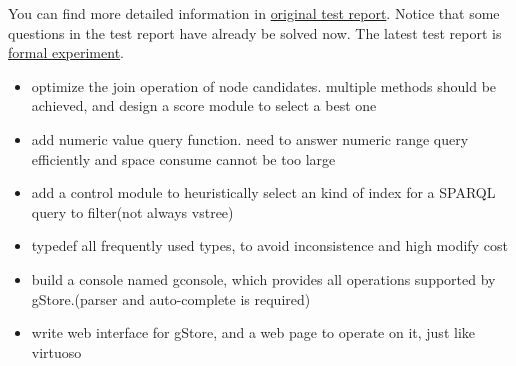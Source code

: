 \documentclass[titlepage, a4paper, 12pt]{article}
\begin{document}
You can find more detailed information in \href{run:../pdf/gstore_test_report.pdf}{original test report}. Notice that some questions in the test report have already be solved now.
The latest test report is \href{run:../latex/formal_experiment.pdf}{formal experiment}.

\clearpage



\begin{itemize}
\item
  optimize the join operation of node candidates. multiple methods
  should be achieved, and design a score module to select a best one
\item
  add numeric value query function. need to answer numeric range query
  efficiently and space consume cannot be too large
\item
  add a control module to heuristically select an kind of index for a
  SPARQL query to filter(not always vstree)
\item
  typedef all frequently used types, to avoid inconsistence and high
  modify cost
\end{itemize}


\begin{itemize}
\item
  build a console named gconsole, which provides all operations
  supported by gStore.(parser and auto-complete is required)
\item
  write web interface for gStore, and a web page to operate on it, just
  like virtuoso
\end{itemize}

\end{document}
